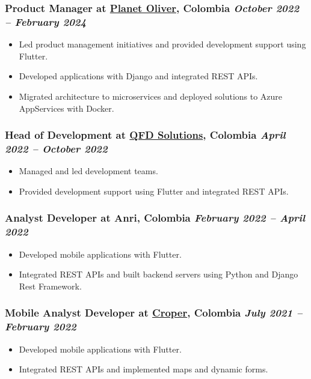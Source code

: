 \documentclass[a4paper,10pt]{article}
\begin{document}
\subsubsection*{%
  \textbf{Product Manager} at \href{https://startupslatam.com/planet-oliver-la-startup-colombiana-que-con-tecnologia-elimina-el-desperdicio-de-comida-alcanza-los-12-mil-usuarios/}{Planet Oliver}, Colombia
  \hfill
  \textit{October 2022 -- February 2024}
}
\begin{itemize}
  \item Led product management initiatives and provided development support using Flutter.
  \item Developed applications with Django and integrated REST APIs.
  \item Migrated architecture to microservices and deployed solutions to Azure AppServices with Docker.
\end{itemize}

\subsubsection*{%
  \textbf{Head of Development} at \href{https://www.linkedin.com/company/qfdsolutions/posts/?feedView=all}{QFD Solutions}, Colombia
  \hfill
  \textit{April 2022 -- October 2022}
}
\begin{itemize}
  \item Managed and led development teams.
  \item Provided development support using Flutter and integrated REST APIs.
\end{itemize}

\subsubsection*{%
  \textbf{Analyst Developer} at Anri, Colombia
  \hfill
  \textit{February 2022 -- April 2022}
}
\begin{itemize}
  \item Developed mobile applications with Flutter.
  \item Integrated REST APIs and built backend servers using Python and Django Rest Framework.
\end{itemize}

\subsubsection*{%
  \textbf{Mobile Analyst Developer} at \href{https://www.linkedin.com/company/agrofuturo/posts/?feedView=all}{Croper}, Colombia
  \hfill
  \textit{July 2021 -- February 2022}
}
\begin{itemize}
  \item Developed mobile applications with Flutter.
  \item Integrated REST APIs and implemented maps and dynamic forms.
\end{itemize}
\end{document}
